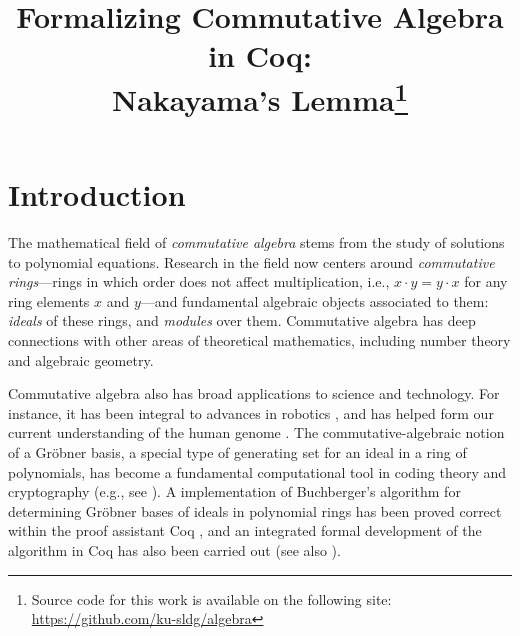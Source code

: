 \documentclass[referee,sn-mathphys]{sn-jnl}
\theoremstyle{definition}
\theoremstyle{remark}
\numberwithin{equation}{section}
\numberwithin{figure}{subsection}
\begin{document}
\title[Formalizing Commutative Algebra in Coq]{ 
Formalizing Commutative Algebra in Coq: \\
Nakayama's Lemma\thanks{Source code for this work is available on the following
site: \url{https://github.com/ku-sldg/algebra}}
}

\author[1]{ }
\author[1]{}
\author[1]{ }



\maketitle	

\section{Introduction}
The mathematical field of \emph{commutative algebra} stems from the study of
solutions to polynomial equations. Research in the field now centers around
\emph{commutative rings}---rings in which order does not affect multiplication,
i.e., $x \cdot y = y \cdot x$ for any ring elements $x$ and $y$---and
fundamental algebraic objects associated to them:  \emph{ideals} of these
rings, and \emph{modules} over them. Commutative algebra has deep connections
with other areas of theoretical mathematics, including number theory and
algebraic geometry. 

Commutative algebra also has broad applications to science and technology. For
instance, it has been integral to advances in robotics \cite{cox-little-oshea},
and has helped form our current understanding of the human genome
\cite{genetic-algebra}. The commutative-algebraic notion of a Gr\"{o}bner
basis, a special type of generating set for an ideal in a ring of polynomials,
has become a fundamental computational tool in coding theory and cryptography
(e.g., see  \cite{grobner-bases-cryptography}). A implementation of
Buchberger's algorithm \cite{buchberger} for determining Gr\"{o}bner bases of
ideals in polynomial rings has been proved correct within the proof assistant
Coq \cite{the_coq_development_team_2019_3476303,thery-buchberger}, and an
integrated formal development of the algorithm in Coq has also been carried out
\cite{persson2001integrated} (see also \cite{grobner-type-theory}). 
\end{document}
